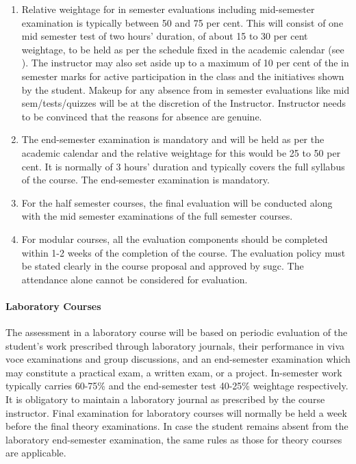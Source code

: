 \begin{enumerate}[leftmargin=15mm]
    \item Relative weightage for in semester evaluations including mid-semester examination is typically between 50 and 75 per cent. This will consist of one mid semester test of two hours’ duration, of about 15 to 30 per cent weightage, to be held as per the schedule fixed in the academic calendar (see ). The instructor may also set aside up to a maximum of 10 per cent of the in semester marks for active participation in the class and the initiatives shown by the \gls{student}. Makeup for any absence from in semester evaluations like mid sem/tests/quizzes will be at the discretion of the Instructor. Instructor needs to be convinced that the reasons for absence are genuine. 
    \item The end-semester examination is mandatory and will be held as per the academic calendar and the relative weightage for this would be 25 to 50 per cent. It is normally of 3 hours’ duration and typically covers the full syllabus of the course. The end-semester examination is mandatory. 
    \item For the half semester courses, the final evaluation will be conducted along with the mid semester examinations of the full semester courses.
    \item For modular courses, all the evaluation components should be completed within 1-2 weeks of the completion of the course. The evaluation policy must be stated clearly in the course proposal and approved by \acrshort{sugc}. The attendance alone cannot be considered for evaluation.
\end{enumerate}

\paragraph{Laboratory Courses} The assessment in a laboratory course will be based on periodic evaluation of the \gls{student}’s work prescribed through laboratory journals, their performance in viva voce examinations and group discussions, and an end-semester examination which may constitute a practical exam, a written exam, or a project. In-semester work typically carries 60-75\% and the end-semester test 40-25\% weightage respectively. It is obligatory to maintain a laboratory journal as prescribed by the course instructor. Final examination for laboratory courses will normally be held a week before the final theory examinations. In case the \gls{student} remains absent from the laboratory end-semester examination, the same rules as those for theory courses are applicable.

